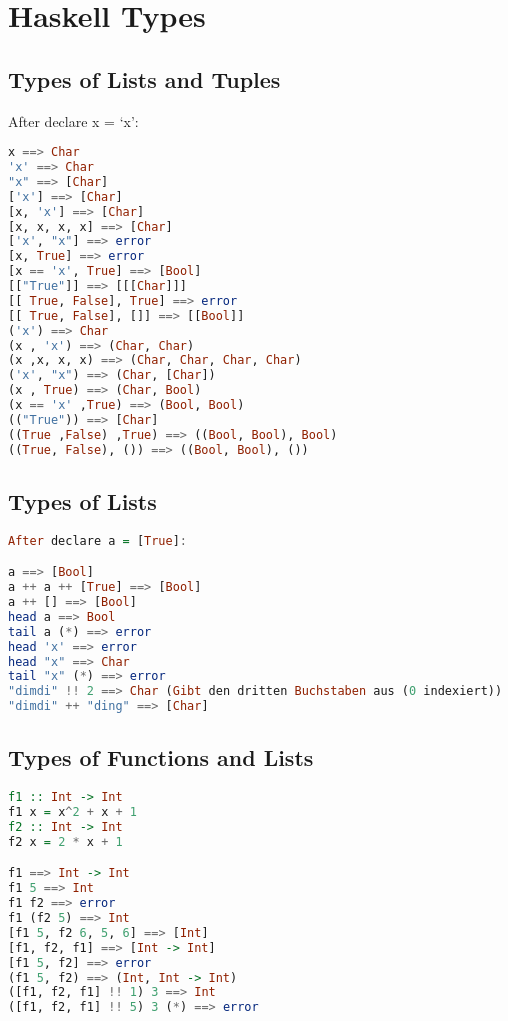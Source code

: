 \hypertarget{haskell-types}{%
\section{Haskell Types}\label{haskell-types}}

\hypertarget{types-of-lists-and-tuples}{%
\subsection{Types of Lists and Tuples}\label{types-of-lists-and-tuples}}

After declare x = `x':

\begin{lstlisting}[language=Haskell]
x ==> Char
'x' ==> Char
"x" ==> [Char]
['x'] ==> [Char]
[x, 'x'] ==> [Char]
[x, x, x, x] ==> [Char]
['x', "x"] ==> error
[x, True] ==> error
[x == 'x', True] ==> [Bool]
[["True"]] ==> [[[Char]]]
[[ True, False], True] ==> error
[[ True, False], []] ==> [[Bool]]
('x') ==> Char
(x , 'x') ==> (Char, Char)
(x ,x, x, x) ==> (Char, Char, Char, Char)
('x', "x") ==> (Char, [Char])
(x , True) ==> (Char, Bool)
(x == 'x' ,True) ==> (Bool, Bool)
(("True")) ==> [Char]
((True ,False) ,True) ==> ((Bool, Bool), Bool)
((True, False), ()) ==> ((Bool, Bool), ())
\end{lstlisting}

\hypertarget{types-of-lists}{%
\subsection{Types of Lists}\label{types-of-lists}}

\begin{lstlisting}[language=Haskell]
After declare a = [True]:

a ==> [Bool]
a ++ a ++ [True] ==> [Bool]
a ++ [] ==> [Bool]
head a ==> Bool
tail a (*) ==> error
head 'x' ==> error
head "x" ==> Char
tail "x" (*) ==> error
"dimdi" !! 2 ==> Char (Gibt den dritten Buchstaben aus (0 indexiert))
"dimdi" ++ "ding" ==> [Char]
\end{lstlisting}

\hypertarget{types-of-functions-and-lists}{%
\subsection{Types of Functions and
Lists}\label{types-of-functions-and-lists}}

\begin{lstlisting}[language=Haskell]
f1 :: Int -> Int
f1 x = x^2 + x + 1
f2 :: Int -> Int
f2 x = 2 * x + 1

f1 ==> Int -> Int
f1 5 ==> Int
f1 f2 ==> error
f1 (f2 5) ==> Int
[f1 5, f2 6, 5, 6] ==> [Int]
[f1, f2, f1] ==> [Int -> Int]
[f1 5, f2] ==> error
(f1 5, f2) ==> (Int, Int -> Int)
([f1, f2, f1] !! 1) 3 ==> Int
([f1, f2, f1] !! 5) 3 (*) ==> error
\end{lstlisting}

